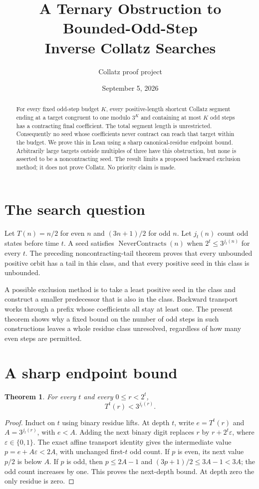 \documentclass[10pt]{article}
\title{A Ternary Obstruction to Bounded-Odd-Step\\Inverse Collatz Searches}
\author{Collatz proof project}
\date{September 5, 2026}
\newtheorem{theorem}{Theorem}
\begin{document}
\maketitle
\begin{abstract}
For every fixed odd-step budget $K$, every positive-length shortcut Collatz
segment ending at a target congruent to one modulo $3^K$ and containing
at most $K$ odd steps has a contracting final coefficient. The total
segment length is unrestricted. Consequently no seed whose coefficients
never contract can reach that target within the budget. We prove this
in Lean using a sharp canonical-residue endpoint bound. Arbitrarily large
targets outside multiples of three have this obstruction, but none is
asserted to be a noncontracting seed. The result limits a proposed backward
exclusion method; it does not prove Collatz. No priority claim is made.
\end{abstract}

\section{The search question}
Let $T(n)=n/2$ for even $n$ and $(3n+1)/2$ for odd $n$. Let $j_t(n)$
count odd states before time $t$. A seed satisfies
$\operatorname{NeverContracts}(n)$ when $2^t\le3^{j_t(n)}$ for every $t$.
The preceding noncontracting-tail theorem proves that every unbounded
positive orbit has a tail in this class, and that every positive seed
in this class is unbounded.

A possible exclusion method is to take a least positive seed in the class
and construct a smaller predecessor that is also in the class. Backward
transport works through a prefix whose coefficients all stay at least one.
The present theorem shows why a fixed bound on the number of odd steps in
such constructions leaves a whole residue class unresolved, regardless
of how many even steps are permitted.

\section{A sharp endpoint bound}
\begin{theorem}\label{thm:canonical}
For every $t$ and every $0\le r<2^t$,
\[
T^t(r)<3^{j_t(r)}.
\]
\end{theorem}
\begin{proof}
Induct on $t$ using binary residue lifts. At depth $t$, write $e=T^t(r)$
and $A=3^{j_t(r)}$, with $e<A$. Adding the next binary digit replaces
$r$ by $r+2^t\varepsilon$, where $\varepsilon\in\{0,1\}$. The exact
affine transport identity gives the intermediate value
$p=e+A\varepsilon<2A$, with unchanged first-$t$ odd count.
If $p$ is even, its next value $p/2$ is below $A$. If $p$ is odd, then
$p\le2A-1$ and $(3p+1)/2\le3A-1<3A$; the odd count increases by one.
This proves the next-depth bound. At depth zero the only residue is zero.
\end{proof}
\end{document}
